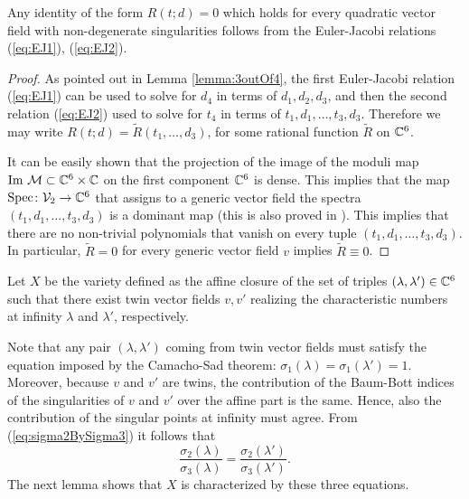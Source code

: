 \documentclass[phd,tocprelim]{cornell}
\begin{document}

\begin{lemma}\label{lemma:finiteSpectra}
 Any identity of the form $R(t;d)=0$ which holds for every quadratic vector field with non-degenerate singularities follows from the Euler-Jacobi relations (\ref{eq:EJ1}), (\ref{eq:EJ2}).
\end{lemma}

\begin{proof}
 As pointed out in Lemma \ref{lemma:3outOf4}, the first Euler-Jacobi relation (\ref{eq:EJ1}) can be used to solve for $d_4$ in terms of $d_1,d_2,d_3$, and then the second relation (\ref{eq:EJ2}) used to solve for $t_4$ in terms of $t_1,d_1,\ldots,t_3,d_3$. Therefore we may write $R(t;d)=\tilde{R}(t_1,\ldots,d_3)$, for some rational function $\tilde{R}$ on $\mathbb{C}^6$.
 
 It can be easily shown that the projection of the image of the moduli map $\operatorname{Im}\,\mathcal{M}\subset\mathbb{C}^6\times\mathbb{C}$ on the first component $\mathbb{C}^6$ is dense. This implies that the map $\operatorname{Spec}\colon\mathcal{V}_2\to\mathbb{C}^6$ that assigns to a generic vector field the spectra $(t_1,d_1,\ldots,t_3,d_3)$ is a dominant map (this is also proved in \cite{TwinVectorFields}). This implies that there are no non-trivial polynomials that vanish on every tuple $(t_1,d_1,\ldots,t_3,d_3)$. In particular, $\tilde{R}=0$ for every generic vector field $v$ implies $\tilde{R}\equiv 0$. 
\end{proof}

Let $X$ be the variety defined as the affine closure of the set of triples $(\lambda,\lambda')\in\mathbb{C}^6$ such that there exist twin vector fields $v,v'$ realizing the characteristic numbers at infinity $\lambda$ and $\lambda'$, respectively.

Note that any pair $(\lambda,\lambda')$ coming from twin vector fields must satisfy the equation imposed by the Camacho-Sad theorem: $\sigma_1(\lambda)=\sigma_1(\lambda')=1$. Moreover, because $v$ and $v'$ are twins, the contribution of the Baum-Bott indices of the singularities of $v$ and $v'$ over the affine part is the same. Hence, also the contribution of the singular points at infinity must agree. From (\ref{eq:sigma2BySigma3}) it follows that
 \begin{equation}\label{eq:equalBB}
  \frac{\sigma_2(\lambda)}{\sigma_3(\lambda)} = \frac{\sigma_2(\lambda')}{\sigma_3(\lambda')} .
 \end{equation}
The next lemma shows that $X$ is characterized by these three equations.
\end{document}
